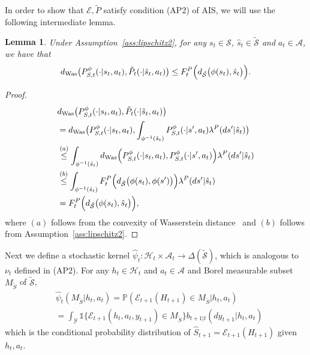 \documentclass[letterpaper, 10pt]{IEEEtran}
\theoremstyle{plain}
\newtheorem{lemma}{Lemma}
\theoremstyle{nonumberplain}
\newtheorem{proof}{Proof}
\theoremstyle{plain}
\newcommand*\ALPHABET{\mathcal}
\newcommand*\ABSTRACT{\tilde}
\newcommand*\ESTIMATE{\hat}
\newcommand*\PR{\mathds{P}}
\newcommand*\IND{\mathds{1}}
\newcommand\dWas{d_{\mathrm{Was}}}
\newcommand\dhS{d_{\ABSTRACT {\ALPHABET S}}}
\newcommand\EST{\mathcal{E}}
\begin{document}
In order to show  that $\EST, \ABSTRACT P$ satisfy condition (AP2) of AIS, we will use the following intermediate lemma.
\begin{lemma}\label{lem:dWas}
Under Assumption~\ref{ass:lipschitz2}, for any $s_t \in \ALPHABET S$, $\ESTIMATE s_t \in \ABSTRACT{\ALPHABET S}$ and $a_t \in \ALPHABET A$, we have that
\begin{equation*}
       \dWas\bigl(P^{\phi}_{S,t}(\cdot|s_t,a_t), \ABSTRACT P_t (\cdot|\ESTIMATE s_t,a_t)\bigr) 
       \le F_t^P \Bigl(\dhS \bigl(\phi(s_t),\ESTIMATE s_t\bigr)\Bigr).
\end{equation*}
\end{lemma}
\begin{proof}
   \begin{align}
       &\dWas\bigl(P^{\phi}_{S,t}(\cdot|s_t,a_t), \ABSTRACT P_t (\cdot|\ESTIMATE s_t,a_t)\bigr) \nonumber \\
       &= \dWas\bigl(P^{\phi}_{S,t}(\cdot|s_t,a_t), \int_{\phi^{-1}(\ESTIMATE s_t)}P^{\phi}_{S,t}(\cdot|s',a_t)\lambda^P(ds'|\ESTIMATE s_t) \bigr) \nonumber \\
       &\stackrel{(a)}{\leq} \int_{\phi^{-1}(\ESTIMATE s_t)}\dWas\Bigl(P^{\phi}_{S,t}(\cdot|s_t,a_t), P^{\phi}_{S,t}(\cdot|s',a_t)\Bigr) \lambda^P(ds'|\ESTIMATE s_t) \nonumber \\
       &\stackrel{(b)}{\leq} \int_{\phi^{-1}(\ESTIMATE s_t)}F_t^P \Bigl(\dhS \bigl(\phi(s_t),\phi(s')\bigr)\Bigr)\lambda^P(ds'|\ESTIMATE s_t)  \nonumber \\
       &= F_t^P \Bigl(\dhS \bigl(\phi(s_t),\ESTIMATE s_t\bigr)\Bigr),
   \end{align}
   where $(a)$ follows from the convexity of Wasserstein distance~\cite[Thm. 4.8]{villani2009optimal} and $(b)$ follows from Assumption~\ref{ass:lipschitz2}.
\end{proof}

Next we define a stochastic kernel $\ESTIMATE \psi_t \colon \ALPHABET H_t \times \ALPHABET A_t \to \Delta(\ABSTRACT{\ALPHABET S})$, which is analogous to $\nu_t$ defined in (AP2).
For any $h_t \in \ALPHABET H_t$ and $a_t \in \ALPHABET A$ and  Borel measurable subset $M_{\ABSTRACT S}$ of $\ABSTRACT{\ALPHABET S}$, 
\begin{align}
   &\ESTIMATE \psi_{t}(M_{\ABSTRACT S} | h_t, a_t) = \PR(\EST_{t+1}(H_{t+1}) \in M_{\ABSTRACT S} | h_t, a_t) \nonumber \\
   & = \int_{\ALPHABET Y} \IND\{ \EST_{t+1}(h_t,a_t,y_{t+1}) \in M_{\ABSTRACT S} \} b_{t+1|t}(dy_{t+1} | h_t, a_t)\label{eq:hatnu}
\end{align}
which is the conditional probability distribution of $\ESTIMATE{S}_{t+1} =\EST_{t+1}(H_{t+1})$ given $h_t,a_t$. 
\end{document}
